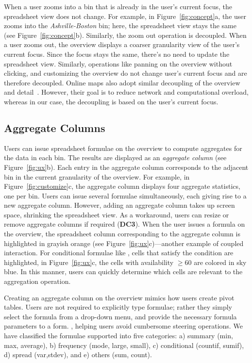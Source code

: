 When a user zooms into a bin
that is already in the user's current focus,
the spreadsheet view does not change.
For example, in Figure~\ref{fig:concept}a,
the user zooms into the \emph{Ashville-Boston} bin;
here, the spreadsheet view stays the same
(see Figure~\ref{fig:concept}b).
Similarly, the zoom out operation is decoupled.
When a user zooms out,
the overview displays
a coarser granularity view
of the user's current focus.
Since the focus stays the same,
there's no need to update the spreadsheet view.
Similarly, operations like panning on the overview without clicking,
and customizing the overview
do not change user's current focus and are therefore decoupled.
Online maps also adopt similar
decoupling of the overview and detail~\cite{cockburn2009review}.
However, their goal is to reduce network
and computational overload, whereas in our case,
the decoupling is based on the user's current focus.

\subsection{Aggregate Columns}
Users can issue spreadsheet formulae
on the overview
to compute aggregates for the data
in each bin.
The results
are displayed as an {\em aggregate column} (see Figure~\ref{fig:ux}b). Each entry in the aggregate column
corresponds to the adjacent bin
in the current granularity
of the overview.
For example, in Figure~\ref{fig:customize}c,
the aggregate column displays
four aggregate statistics,
one per bin.
Users can issue several formulae simultaneously,
each giving rise to a new aggregate column.
However, adding an aggregate column
takes up screen space, shrinking the spreadsheet view.
As a workaround, users can resize or
remove aggregate columns if required (\textbf{DC3}).
When the user issues a formula on the overview,
the spreadsheet column
corresponding to the aggregate column
is highlighted in grayish orange
(see Figure~\ref{fig:ux}c)---another example of coupled interaction.
For conditional formulae like ,
cells that satisfy the condition
are highlighted, \eg in Figure~\ref{fig:ux}c,
the cells with availability $\ge 60$ are colored in sky blue.
In this manner,
users can quickly determine which cells
are relevant to the aggregation operation.

Creating an aggregate column on the overview mimics how users create pivot tables. Users
are not required to explicitly type formulae;
rather they simply select the formula from a drop-down menu,
and provide the necessary formula parameters to a form.
,
helping users avoid cumbersome steering operations.
We have classified the formulae supported
into five categories: a) summary (\eg min, max, average),
b) frequency (\eg mode, large, small), c) conditional (\eg countif, sumif), d) spread (\eg var,stdev), and e) others (\eg sum, count).

